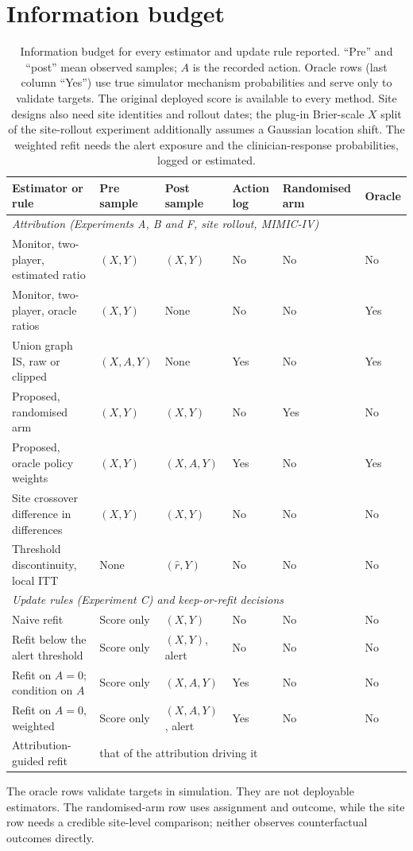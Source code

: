 \documentclass[letterpaper]{article} %
\newcommand{\rhat}{\hat r}
\begin{document}


\appendix
\section{Information budget}
\label{app:information}
\begin{table}[t]
\centering\small
\caption{Information budget for every estimator and update rule reported.
``Pre'' and ``post'' mean observed samples; $A$ is the recorded action.
Oracle rows (last column ``Yes'') use true simulator mechanism probabilities
and serve only to validate targets. The original deployed score is available
to every method. Site designs also need site identities and rollout dates;
the plug-in Brier-scale $X$ split of the site-rollout experiment additionally assumes a Gaussian
location shift. The weighted refit needs the alert exposure and the
clinician-response probabilities, logged or estimated.}
\label{tab:information}
\begin{tabular}{llllll}
\toprule
Estimator or rule & Pre sample & Post sample & Action log & Randomised arm & Oracle\\
\midrule
\multicolumn{6}{l}{\emph{Attribution (Experiments A, B and F, site rollout, MIMIC-IV)}}\\
Monitor, two-player, estimated ratio & $(X,Y)$ & $(X,Y)$ & No & No & No\\
Monitor, two-player, oracle ratios & $(X,Y)$ & None & No & No & Yes\\
Union graph IS, raw or clipped & $(X,A,Y)$ & None & Yes & No & Yes\\
Proposed, randomised arm & $(X,Y)$ & $(X,Y)$ & No & Yes & No\\
Proposed, oracle policy weights & $(X,Y)$ & $(X,A,Y)$ & Yes & No & Yes\\
Site crossover difference in differences & $(X,Y)$ & $(X,Y)$ & No & No & No\\
Threshold discontinuity, local ITT & None & $(\rhat,Y)$ & No & No & No\\
\multicolumn{6}{l}{\emph{Update rules (Experiment C) and keep-or-refit decisions}}\\
Naive refit & Score only & $(X,Y)$ & No & No & No\\
Refit below the alert threshold & Score only & $(X,Y)$, alert & No & No & No\\
Refit on $A=0$; condition on $A$ & Score only & $(X,A,Y)$ & Yes & No & No\\
Refit on $A=0$, weighted & Score only & $(X,A,Y)$, alert & Yes & No & No\\
Attribution-guided refit & \multicolumn{5}{l}{that of the attribution driving it}\\
\bottomrule
\end{tabular}
\end{table}
The oracle rows validate targets in simulation. They are not deployable
estimators. The randomised-arm row uses assignment and outcome, while the site
row needs a credible site-level comparison; neither observes counterfactual
outcomes directly.
\end{document}

